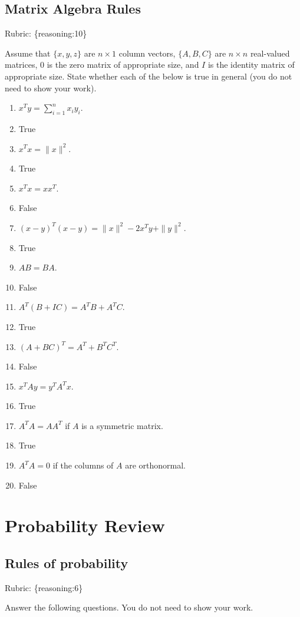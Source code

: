 \documentclass{article}
\def\rubric#1{\gre{Rubric: \{#1\}}}{}
\def\blu#1{{\color{blu}#1}}
\def\gre#1{{\color{gre}#1}}
\def\red#1{{\color{red}#1}}
\def\norm#1{\|#1\|}
\begin{document}
\subsection{Matrix Algebra Rules}
\rubric{reasoning:10}

Assume that $\{x,y,z\}$ are $n \times 1$ column vectors, $\{A,B,C\}$ are $n \times n$ real-valued matrices, \red{$0$ is the zero matrix of appropriate size}, and $I$ is the identity matrix of appropriate size. \blu{State whether each of the below is true in general} (you do not need to show your work).

\begin{enumerate}
\item $x^Ty = \sum_{i=1}^n x_iy_i$.
\item[] \gre{True}
\item $x^Tx = \norm{x}^2$.
\item[] \gre{True}
\item $x^Tx = xx^T$.
\item[] \gre{False}
\item $(x-y)^T(x-y) = \norm{x}^2 - 2x^Ty + \norm{y}^2$.
\item[] \gre{True}
\item $AB=BA$.
\item[] \gre{False}
\item $A^T(B + IC) = A^TB + A^TC$.
\item[] \gre{True}
\item $(A + BC)^T = A^T + B^TC^T$.
\item[] \gre{False}
\item $x^TAy = y^TA^Tx$.
\item[] \gre{True}
\item $A^TA = AA^T$ if $A$ is a symmetric matrix.
\item[] \gre{True}
\item $A^TA = 0$ if the columns of $A$ are orthonormal.
\item[] \gre{False}
\end{enumerate}

\section{Probability Review}

\subsection{Rules of probability}
\rubric{reasoning:6}

\blu{Answer the following questions.} You do not need to show your work.
\end{document}
